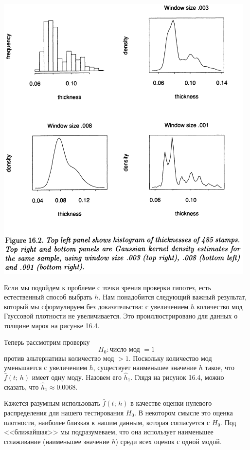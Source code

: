 \newpage
\noindent
\includegraphics[width=\linewidth]{16/f16.2.png}

Если мы подойдем к проблеме с точки зрения проверки гипотез, есть естественный способ выбрать $h$. Нам понадобится следующий важный результат, который мы сформулируем без доказательства: с увеличением $h$ количество мод Гауссовой плотности не увеличивается. Это проиллюстрировано для данных о толщине марок на рисунке 16.4.

Теперь рассмотрим проверку
\begin{equation}\label{eq16.20}
    H_0: \text{число мод } = 1 
\end{equation}
против альтернативы количество мод $> 1$. Поскольку количество мод уменьшается с увеличением $h$, существует наименьшее значение $h$ такое, что $\hat{f}(t;\, h)$ имеет одну моду. Назовем его $\hat{h}_1$. Глядя на рисунок 16.4, можно сказать, что $\hat{h}_1 \approx 0.0068$.

Кажется разумным использовать $\hat{f}(t;\, h)$ в качестве оценки нулевого распределения для нашего тестирования $H_0$. В некотором смысле это оценка плотности, наиболее близкая к нашим данным, которая согласуется с $H_0$. Под <<ближайшая>> мы подразумеваем, что она использует наименьшее сглаживание (наименьшее значение $h$) среди всех оценок с одной модой.

